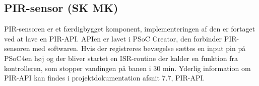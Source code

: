 \subsection{PIR-sensor (SK MK)}

PIR-sensoren er et færdigbygget komponent, implementeringen af den er fortaget ved at lave en PIR-API. APIen er lavet i PSoC Creator, den forbinder PIR-sensoren med softwaren. Hvis der registreres bevægelse sættes en input pin på PSoC4en høj og der bliver startet en ISR-routine der kalder en funktion fra kontrolleren, som stopper vandingen på banen i 30 min. Yderlig information om PIR-API kan findes i projektdokumentation afsnit 7.7, PIR-API. 